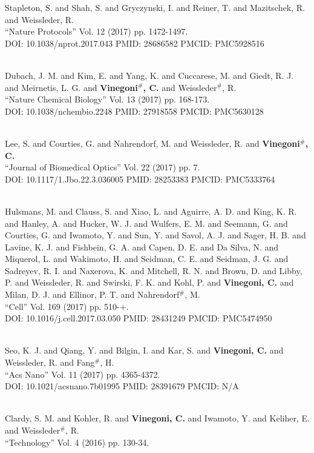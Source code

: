 Stapleton, S. and Shah, S. and Gryczynski, I. and Reiner, T. and Mazitschek, R. and Weissleder, R. \\ ``Nature Protocols'' Vol. 12 (2017) pp. 1472-1497. \\ DOI: 10.1038/nprot.2017.043 PMID: 28686582 PMCID: PMC5928516\item {} \\ Dubach, J. M. and Kim, E. and Yang, K. and Cuccarese, M. and Giedt, R. J. and Meirnetis, L. G. and {\bf Vinegoni$^\#$, C.} and Weissleder$^\#$, R. \\ ``Nature Chemical Biology'' Vol. 13 (2017) pp. 168-173. \\ DOI: 10.1038/nchembio.2248 PMID: 27918558 PMCID: PMC5630128\item {} \\ Lee, S. and Courties, G. and Nahrendorf, M. and Weissleder, R. and {\bf Vinegoni$^\#$, C.} \\ ``Journal of Biomedical Optics'' Vol. 22 (2017) pp. 7. \\ DOI: 10.1117/1.Jbo.22.3.036005 PMID: 28253383 PMCID: PMC5333764\item {} \\ Hulsmans, M. and Clauss, S. and Xiao, L. and Aguirre, A. D. and King, K. R. and Hanley, A. and Hucker, W. J. and Wulfers, E. M. and Seemann, G. and Courties, G. and Iwamoto, Y. and Sun, Y. and Savol, A. J. and Sager, H. B. and Lavine, K. J. and Fishbein, G. A. and Capen, D. E. and Da Silva, N. and Miquerol, L. and Wakimoto, H. and Seidman, C. E. and Seidman, J. G. and Sadreyev, R. I. and Naxerova, K. and Mitchell, R. N. and Brown, D. and Libby, P. and Weissleder, R. and Swirski, F. K. and Kohl, P. and {\bf Vinegoni, C.} and Milan, D. J. and Ellinor, P. T. and Nahrendorf$^\#$, M. \\ ``Cell'' Vol. 169 (2017) pp. 510-+. \\ DOI: 10.1016/j.cell.2017.03.050 PMID: 28431249 PMCID: PMC5474950\item {} \\ Seo, K. J. and Qiang, Y. and Bilgin, I. and Kar, S. and {\bf Vinegoni, C.} and Weissleder, R. and Fang$^\#$, H. \\ ``Acs Nano'' Vol. 11 (2017) pp. 4365-4372. \\ DOI: 10.1021/acsnano.7b01995 PMID: 28391679 PMCID: N/A\item {} \\ Clardy, S. M. and Kohler, R. and {\bf Vinegoni, C.} and Iwamoto, Y. and Keliher, E. and Weissleder$^\#$, R. \\ ``Technology'' Vol. 4 (2016) pp. 130-34. \\ 